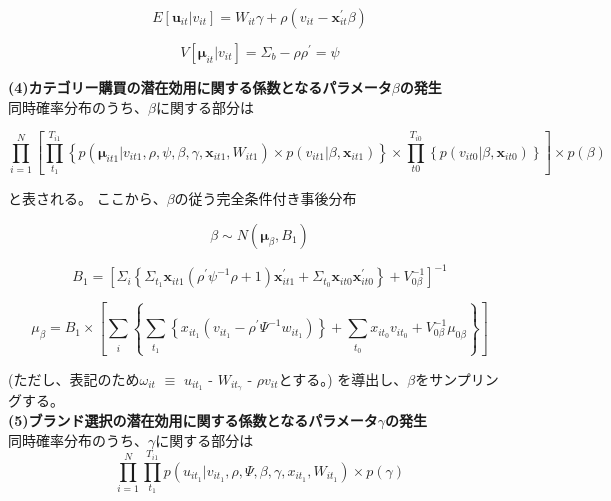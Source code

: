 \documentclass[11pt]{jsarticle}
\begin{document}
\begin{equation}\label{formula35}
E[{\boldsymbol u}_{it}|v_{it}]=W_{it}\gamma+\rho(v_{it}-\textbf{x}_{it}^{'}\beta)
\end{equation}

\begin{equation}\label{formula36}
V[{\boldsymbol\mu}_{it}|v_{it}]=\Sigma_{b}-\rho\rho^{'}=\psi
\end{equation}

{\bf (4)カテゴリー購買の潜在効用に関する係数となるパラメータ$\beta$の発生}\\
同時確率分布のうち、$\beta$に関する部分は

\begin{equation}\label{formula41}
\prod_{i=1}^{N}\left[
 \prod_{t_{1}}^{T_{i1}}\left\{
  p({\boldsymbol\mu}_{it1}|v_{it1},\rho,\psi,\beta,\gamma,\textbf{x}_{it1},W_{it1})
  ×p(v_{it1}|\beta,\textbf{x}_{it1})
 \right\}
 ×\prod_{t0}^{T_{i0}}\left\{
  p(v_{it0}|\beta,\textbf{x}_{it0})
 \right\}
\right]
×p(\beta)
\end{equation}

と表される。
ここから、$\beta$の従う完全条件付き事後分布

\begin{equation}\label{formula42}
\beta \sim N({\boldsymbol\mu}_{\beta},B_{1})
\end{equation}

\begin{equation}\label{formula43}
B_{1} = \left[
 \Sigma_{i}\left\{
  \Sigma_{t_{1}}\textbf{x}_{it1}(\rho^{'}\psi^{-1}\rho+1)\textbf{x}_{it1}^{'}
  +\Sigma_{t_{0}}\textbf{x}_{it0}\textbf{x}_{it0}^{'}
 \right\}
 +V_{0\beta}^{-1}
\right]^{-1}
\end{equation}

\begin{equation} \label{formula44}
\mu_{\beta} = B_{1} \times
\left[
\sum_{\substack{i}}
\left\{
\sum_{\substack{t_{1}}}
\left\{
x_{it_{1}} (v_{it_{1}} - \rho^{\prime} \Psi^{-1} w_{it_{1}})
\right\} + \sum_{\substack{t_{0}}} x_{it_{0}} v_{it_{0}} + V^{-1}_{0\beta} \mu_{0\beta}
\right\}
\right]
\end{equation}

(ただし、表記のため$\omega_{it}$ $\equiv$ $u_{it_{1}}$ - $W_{it_{\gamma}}$ - $\rho v_{it}$とする。)
を導出し、$\beta$をサンプリングする。\\[1ex] 

{\bf (5)ブランド選択の潜在効用に関する係数となるパラメータ$\gamma$の発生}\\
同時確率分布のうち、$\gamma$に関する部分は
\begin{equation} \label{formula45}
\prod_{i=1}^{N} \prod_{t_{1}}^{T_{i1}} p(u_{it_{1}} | v_{it_{1}}, \rho, \Psi, \beta, \gamma, x_{it_{1}}, W_{it_{1}}) \times p(\gamma)
\end{equation}
\end{document}
